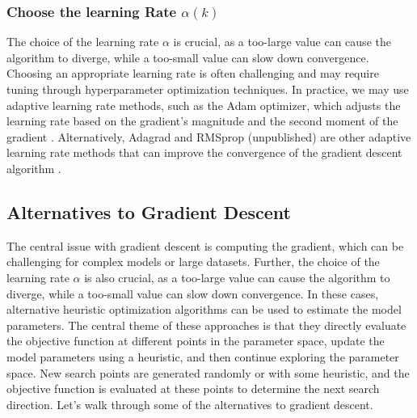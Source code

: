 \documentclass{article}[11pt]
\begin{document}
\subsubsection*{Choose the learning Rate $\alpha(k)$}
The choice of the learning rate $\alpha$ is crucial, as a too-large value can cause the algorithm to diverge, while a too-small value can slow down convergence.
Choosing an appropriate learning rate is often challenging and may require tuning through hyperparameter optimization techniques. 
In practice, we may use adaptive learning rate methods, such as the Adam optimizer, which adjusts the learning rate based on the gradient's magnitude and the second moment of the gradient \cite{ADAM-2014}.
Alternatively, Adagrad and RMSprop (unpublished) are other adaptive learning rate methods that can improve the convergence of the gradient descent algorithm \cite{ADAGrad2011}.

\subsection{Alternatives to Gradient Descent}
The central issue with gradient descent is computing the gradient, which can be challenging for complex models or large datasets.
Further, the choice of the learning rate $\alpha$ is also crucial, as a too-large value can cause the algorithm to diverge, while a too-small value can slow down convergence.
In these cases, alternative heuristic optimization algorithms can be used to estimate the model parameters.
The central theme of these approaches is that they directly evaluate the objective function at different points in the parameter space, update the model parameters using a heuristic, and then continue exploring the parameter space.
New search points are generated randomly or with some heuristic, and the objective function is evaluated at these points to determine the next search direction.
Let's walk through some of the alternatives to gradient descent.
\end{document}
